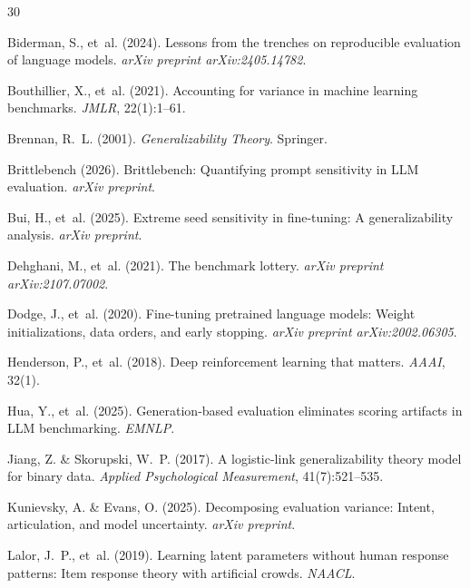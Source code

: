 \documentclass[11pt,a4paper]{article}
\begin{document}
\begin{thebibliography}{30}

Biderman, S., et~al. (2024).
\newblock Lessons from the trenches on reproducible evaluation of language models.
\newblock \emph{arXiv preprint arXiv:2405.14782}.

Bouthillier, X., et~al. (2021).
\newblock Accounting for variance in machine learning benchmarks.
\newblock \emph{JMLR}, 22(1):1--61.

Brennan, R.~L. (2001).
\newblock \emph{Generalizability Theory}.
\newblock Springer.

Brittlebench (2026).
\newblock Brittlebench: Quantifying prompt sensitivity in LLM evaluation.
\newblock \emph{arXiv preprint}.

Bui, H., et~al. (2025).
\newblock Extreme seed sensitivity in fine-tuning: A generalizability analysis.
\newblock \emph{arXiv preprint}.

Dehghani, M., et~al. (2021).
\newblock The benchmark lottery.
\newblock \emph{arXiv preprint arXiv:2107.07002}.

Dodge, J., et~al. (2020).
\newblock Fine-tuning pretrained language models: Weight initializations, data orders, and early stopping.
\newblock \emph{arXiv preprint arXiv:2002.06305}.

Henderson, P., et~al. (2018).
\newblock Deep reinforcement learning that matters.
\newblock \emph{AAAI}, 32(1).

Hua, Y., et~al. (2025).
\newblock Generation-based evaluation eliminates scoring artifacts in LLM benchmarking.
\newblock \emph{EMNLP}.

Jiang, Z. \& Skorupski, W.~P. (2017).
\newblock A logistic-link generalizability theory model for binary data.
\newblock \emph{Applied Psychological Measurement}, 41(7):521--535.

Kunievsky, A. \& Evans, O. (2025).
\newblock Decomposing evaluation variance: Intent, articulation, and model uncertainty.
\newblock \emph{arXiv preprint}.

Lalor, J.~P., et~al. (2019).
\newblock Learning latent parameters without human response patterns: Item response theory with artificial crowds.
\newblock \emph{NAACL}.


\end{thebibliography}
\end{document}
